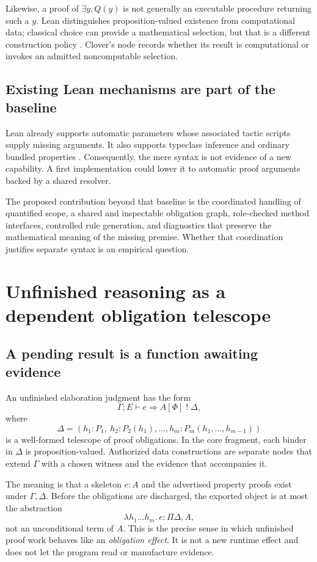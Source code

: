 \documentclass[11pt,a4paper]{article}
\newcommand{\code}[1]{\texttt{\detokenize{#1}}}
\theoremstyle{definition}
\theoremstyle{remark}
\begin{document}
Likewise, a proof of $\exists y, Q(y)$ is not generally an executable procedure
returning such a $y$. Lean distinguishes proposition-valued existence from
computational data; classical choice can provide a mathematical selection, but
that is a different construction policy \cite{lean-quantifiers}. Clover's
\code{construct} node records whether its result is computational or invokes
an admitted noncomputable selection.

\subsection{Existing Lean mechanisms are part of the baseline}

Lean already supports automatic parameters whose associated tactic scripts
supply missing arguments. It also supports typeclass inference and ordinary
bundled properties \cite{lean-application}. Consequently, the mere syntax
\code{requires} is not evidence of a new capability. A first implementation
could lower it to automatic proof arguments backed by a shared resolver.

The proposed contribution beyond that baseline is the coordinated handling
of quantified scope, a shared and inspectable obligation graph, role-checked
method interfaces, controlled rule generation, and diagnostics that preserve
the mathematical meaning of the missing premise. Whether that coordination
justifies separate syntax is an empirical question.

\section{Unfinished reasoning as a dependent obligation telescope}\label{sec:obligations}

\subsection{A pending result is a function awaiting evidence}

An unfinished elaboration judgment has the form
\[
 \Gamma;E\vdash e\Rightarrow A[\Phi]\;!\;\Delta,
\]
where
\[
 \Delta=(h_1:P_1,\ h_2:P_2(h_1),\ldots,
             h_m:P_m(h_1,\ldots,h_{m-1}))
\]
is a well-formed telescope of proof obligations. In the core fragment, each
binder in $\Delta$ is proposition-valued. Authorized data constructions are
separate nodes that extend $\Gamma$ with a chosen witness and the evidence
that accompanies it.

The meaning is that a skeleton $e:A$ and the advertised property proofs exist
under $\Gamma,\Delta$. Before the obligations are discharged, the exported
object is at most the abstraction
\[
 \lambda h_1\ldots h_m.\,e : \Pi\Delta, A,
\]
not an unconditional term of $A$. This is the precise sense in which unfinished
proof work behaves like an \emph{obligation effect}. It is not a new runtime
effect and does not let the program read or manufacture evidence.
\end{document}
